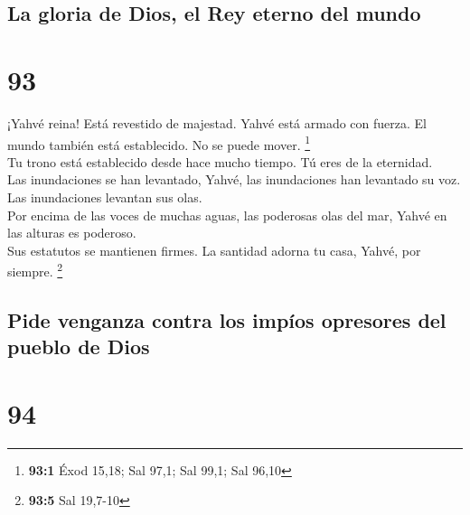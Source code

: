 \hypertarget{la-gloria-de-dios-el-rey-eterno-del-mundo}{%
\subsection{La gloria de Dios, el Rey eterno del
mundo}\label{la-gloria-de-dios-el-rey-eterno-del-mundo}}

\hypertarget{section-90}{%
\section{93}\label{section-90}}

 ¡Yahvé reina! Está revestido de majestad. Yahvé está
armado con fuerza. El mundo también está establecido. No se puede mover.
\footnote{\textbf{93:1} Éxod 15,18; Sal 97,1; Sal 99,1; Sal 96,10}\\
 Tu trono está establecido desde hace mucho tiempo. Tú
eres de la eternidad.\\
 Las inundaciones se han levantado, Yahvé, las
inundaciones han levantado su voz. Las inundaciones levantan sus olas.\\
 Por encima de las voces de muchas aguas, las poderosas
olas del mar, Yahvé en las alturas es poderoso.\\
 Sus estatutos se mantienen firmes. La santidad adorna tu
casa, Yahvé, por siempre. \footnote{\textbf{93:5} Sal 19,7-10}

\hypertarget{pide-venganza-contra-los-impuxedos-opresores-del-pueblo-de-dios}{%
\subsection{Pide venganza contra los impíos opresores del pueblo de
Dios}\label{pide-venganza-contra-los-impuxedos-opresores-del-pueblo-de-dios}}

\hypertarget{section-91}{%
\section{94}\label{section-91}}

